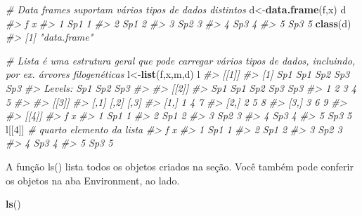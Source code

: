 \documentclass[
]{book}
\newenvironment{Shaded}{\begin{snugshade}}{\end{snugshade}}
\newcommand{\CommentTok}[1]{\textcolor[rgb]{0.56,0.35,0.01}{\textit{#1}}}
\newcommand{\DecValTok}[1]{\textcolor[rgb]{0.00,0.00,0.81}{#1}}
\newcommand{\FunctionTok}[1]{\textcolor[rgb]{0.13,0.29,0.53}{\textbf{#1}}}
\newcommand{\NormalTok}[1]{#1}
\newcommand{\OtherTok}[1]{\textcolor[rgb]{0.56,0.35,0.01}{#1}}
\begin{document}
\begin{Shaded}
\begin{Highlighting}[]
\CommentTok{\# Data frames suportam vários tipos de dados distintos}
\NormalTok{d}\OtherTok{\textless{}{-}}\FunctionTok{data.frame}\NormalTok{(f,x)}
\NormalTok{d}
\CommentTok{\#\textgreater{}     f x}
\CommentTok{\#\textgreater{} 1 Sp1 1}
\CommentTok{\#\textgreater{} 2 Sp1 2}
\CommentTok{\#\textgreater{} 3 Sp2 3}
\CommentTok{\#\textgreater{} 4 Sp3 4}
\CommentTok{\#\textgreater{} 5 Sp3 5}
\FunctionTok{class}\NormalTok{(d)}
\CommentTok{\#\textgreater{} [1] "data.frame"}
\end{Highlighting}
\end{Shaded}

\begin{Shaded}
\begin{Highlighting}[]
\CommentTok{\# Lista é uma estrutura geral que pode carregar vários tipos de dados, incluindo, por ex. árvores filogenéticas}
\NormalTok{l}\OtherTok{\textless{}{-}}\FunctionTok{list}\NormalTok{(f,x,m,d)}
\NormalTok{l}
\CommentTok{\#\textgreater{} [[1]]}
\CommentTok{\#\textgreater{} [1] Sp1 Sp1 Sp2 Sp3 Sp3}
\CommentTok{\#\textgreater{} Levels: Sp1 Sp2 Sp3}
\CommentTok{\#\textgreater{} }
\CommentTok{\#\textgreater{} [[2]]}
\CommentTok{\#\textgreater{} Sp1 Sp1 Sp2 Sp3 Sp3 }
\CommentTok{\#\textgreater{}   1   2   3   4   5 }
\CommentTok{\#\textgreater{} }
\CommentTok{\#\textgreater{} [[3]]}
\CommentTok{\#\textgreater{}      [,1] [,2] [,3]}
\CommentTok{\#\textgreater{} [1,]    1    4    7}
\CommentTok{\#\textgreater{} [2,]    2    5    8}
\CommentTok{\#\textgreater{} [3,]    3    6    9}
\CommentTok{\#\textgreater{} }
\CommentTok{\#\textgreater{} [[4]]}
\CommentTok{\#\textgreater{}     f x}
\CommentTok{\#\textgreater{} 1 Sp1 1}
\CommentTok{\#\textgreater{} 2 Sp1 2}
\CommentTok{\#\textgreater{} 3 Sp2 3}
\CommentTok{\#\textgreater{} 4 Sp3 4}
\CommentTok{\#\textgreater{} 5 Sp3 5}
\NormalTok{l[[}\DecValTok{4}\NormalTok{]] }\CommentTok{\# quarto elemento da lista}
\CommentTok{\#\textgreater{}     f x}
\CommentTok{\#\textgreater{} 1 Sp1 1}
\CommentTok{\#\textgreater{} 2 Sp1 2}
\CommentTok{\#\textgreater{} 3 Sp2 3}
\CommentTok{\#\textgreater{} 4 Sp3 4}
\CommentTok{\#\textgreater{} 5 Sp3 5}
\end{Highlighting}
\end{Shaded}

A função ls() lista todos os objetos criados na seção.
Você também pode conferir os objetos na aba Environment, ao lado.

\begin{Shaded}
\begin{Highlighting}[]
\FunctionTok{ls}\NormalTok{()}
\end{Highlighting}
\end{Shaded}
\end{document}
